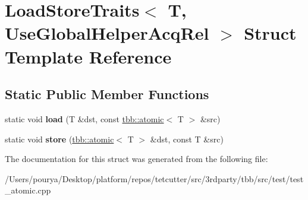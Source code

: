 \hypertarget{structLoadStoreTraits_3_01T_00_01UseGlobalHelperAcqRel_01_4}{}\section{Load\+Store\+Traits$<$ T, Use\+Global\+Helper\+Acq\+Rel $>$ Struct Template Reference}
\label{structLoadStoreTraits_3_01T_00_01UseGlobalHelperAcqRel_01_4}
\subsection*{Static Public Member Functions}
\begin{DoxyCompactItemize}
\item 
\hypertarget{structLoadStoreTraits_3_01T_00_01UseGlobalHelperAcqRel_01_4_ad1d534695ab442cf1b4f2c23f8ee4df8}{}static void {\bfseries load} (T \&dst, const \hyperlink{structtbb_1_1atomic}{tbb\+::atomic}$<$ T $>$ \&src)\label{structLoadStoreTraits_3_01T_00_01UseGlobalHelperAcqRel_01_4_ad1d534695ab442cf1b4f2c23f8ee4df8}

\item 
\hypertarget{structLoadStoreTraits_3_01T_00_01UseGlobalHelperAcqRel_01_4_a3f1a6a6814044f1db4c25ec1dd70e718}{}static void {\bfseries store} (\hyperlink{structtbb_1_1atomic}{tbb\+::atomic}$<$ T $>$ \&dst, const T \&src)\label{structLoadStoreTraits_3_01T_00_01UseGlobalHelperAcqRel_01_4_a3f1a6a6814044f1db4c25ec1dd70e718}

\end{DoxyCompactItemize}


The documentation for this struct was generated from the following file\+:\begin{DoxyCompactItemize}
\item 
/\+Users/pourya/\+Desktop/platform/repos/tetcutter/src/3rdparty/tbb/src/test/test\+\_\+atomic.\+cpp\end{DoxyCompactItemize}
